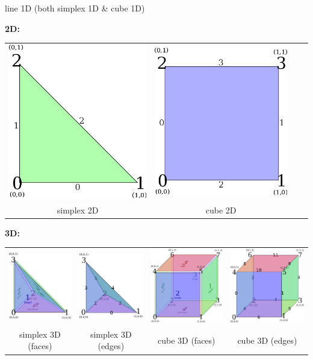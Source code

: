 \documentclass[ignorenonframetext,11pt]{beamer}
\theoremstyle{definition}
\begin{document}
\begin{frame}
\begin{onlyenv}
\begin{center}
      line 1D (both simplex 1D \& cube 1D)
    \end{center}
    \textbf{2D:}
    \begin{center}
      \begin{tabular}{cccc}
        \includegraphics[height=0.23\linewidth]{gg_triangle} &
        \includegraphics[height=0.23\linewidth]{gg_quadrilateral}\\
        simplex 2D & cube 2D\\
      \end{tabular}
    \end{center}
    \textbf{3D:}
    \begin{center}
      \begin{tabular}{cccc}
        \includegraphics[height=0.23\linewidth]{gg_tetrahedron} &
        \includegraphics[height=0.23\linewidth]{gg_tetrahedron_edges} &
        \includegraphics[height=0.23\linewidth]{gg_hexahedron} &
        \includegraphics[height=0.23\linewidth]{gg_hexahedron_edges}
        \\
        simplex 3D (faces) & simplex 3D (edges) & cube 3D (faces) & cube 3D (edges)\\


\end{tabular}
\end{center}
\end{onlyenv}
\end{frame}
\end{document}

